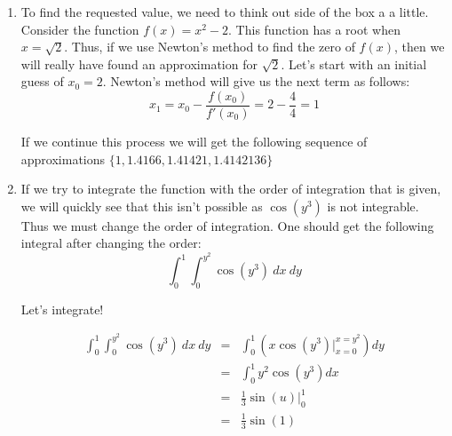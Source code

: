 \documentclass{article}
\begin{document}
    \begin{enumerate}
    \item To find the requested value, we need to think out side of the box a a little. Consider the function $f(x) = x^2-2$. This function has a root when $x=\sqrt{2}$. Thus, if we use Newton's method to find the zero of $f(x)$, then we will really have found an approximation for $\sqrt{2}$. Let's start with an initial guess of $x_0 = 2$. Newton's method will give us the next term as follows:
    \[x_1 = x_0 - \frac{f(x_0)}{f'(x_0)} = 2 - \frac{4}{4} = 1\]
    
    If we continue this process we will get the following sequence of approximations $\{1,1.4166,1.41421,1.4142136\}$

    \item If we try to integrate the function with the order of integration that is given, we will quickly see that this isn't possible as $\cos(y^3)$ is not integrable. Thus we must change the order of integration.  One should get the following integral after changing the order:
    \[\int_0^{1}\int_0^{y^2} \cos(y^3)\ dx\ dy\]
    
    Let's integrate!
    
    \begin{eqnarray*}
    \int_0^{1}\int_0^{y^2} \cos(y^3)\ dx\ dy &=& \int_0 ^1 \left(x\cos(y^3) \biggr|_{x=0}^{x=y^2} \right) dy \\[1em]
    &=& \int_0^1 y^2 \cos(y^3) dx \\[1em]
    &=& \frac{1}{3} \sin(u) \biggr|_0^1 \\[1em]
    &=& \frac{1}{3}\sin(1)
    \end{eqnarray*}
    

\end{enumerate}
\end{document}
